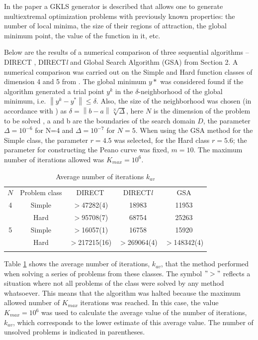 \documentclass{svproc}
\begin{document}
In the paper \cite{Gaviano2003} a GKLS generator is described that allows one to generate multiextremal optimization problems with previously known properties: the number of local minima, the size of their regions of attraction, the global minimum point, the value of the function in it, etc.

Below are the results of a numerical comparison of three sequential algorithms -- DIRECT \cite{Jones2009}, DIRECT\textit{l} \cite{Gablonsky2001} and Global Search Algorithm (GSA) from Section 2.  A numerical comparison was carried out on the Simple and Hard function classes of dimension 4 and 5 from \cite{Gaviano2003}. The global minimum $y*$ was considered found if the algorithm generated a trial point $y^k$ in the $\delta$-neighborhood of the global minimum, i.e. $\left\| {{y}^{k}}-{{y}^{*}} \right\| \leqslant \delta $.  Also, the size of the neighborhood was chosen (in accordance with \cite{Sergeyev2006}) as $\delta =\left\| b-a \right\|\sqrt[N]{\Delta }$, here $N$ is the dimension of the problem to be solved , a and b are the boundaries  of the search domain $D$, the parameter  $\Delta ={{10}^{-6}}$ for N=4 and $\Delta ={{10}^{-7}}$ for $N=5$. When using the GSA method for the Simple class, the parameter $r=4.5$ was selected, for the Hard class $r=5.6$; the parameter for constructing the Peano curve was fixed, $m=10$. The maximum number of iterations allowed was $K_{max} = 10^6$.


\begin{table}
	\caption{Average number of iterations $k_{av}$}\label{table:average_iters}
	\center
	\begin{tabular}{ccccc}
		\hline\noalign{\smallskip}
  	 $N$ & Problem class & DIRECT & DIRECT\textit{l} & GSA \\
		\noalign{\smallskip} \hline \noalign{\smallskip}
			4 &	Simple& $>$47282(4) &	18983 &	11953 \\
	      & Hard &	$>$95708(7) &	68754 &	25263 \\
		\noalign{\smallskip}
			5	& Simple &	$>$16057(1) &	16758 &	15920 \\
				& Hard &	$>$217215(16) &	$>$269064(4) & $>$148342(4) \\
		\noalign{\smallskip}\hline
	\end{tabular}
\end{table}


Table \ref{table:average_iters} shows the average number of iterations, $k_{av}$, that the method performed when solving a series of problems from these classes. The symbol \(">"\) reflects a situation where not all problems of the class were solved by any method whatsoever. This means that the algorithm was halted because the maximum allowed number of $K_{max}$ iterations was reached. In this case, the value $K_{max} = 10^6$ was used to calculate the average value of the number of iterations, $k_{av}$, which corresponds to the lower estimate of this average value. The number of unsolved problems is indicated in parentheses.
   
\end{document}
